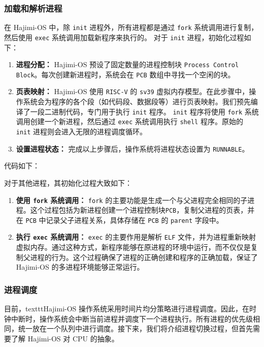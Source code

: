\documentclass[UTF8]{article}
\begin{document}
\subsubsection{加载和解析进程}
在 Hajimi-OS 中，除 \texttt{init} 进程外，所有进程都是通过 \texttt{fork} 系统调用进行复制，然后使用 \texttt{exec} 系统调用加载新程序来执行的。
对于 \texttt{init} 进程，初始化过程如下：
\begin{enumerate}[label=\textbf{\arabic*}., wide, labelwidth=!, labelindent=0pt]
  \item \textbf{进程分配：} Hajimi-OS 预设了固定数量的进程控制块 \texttt{Process Control Block}。每次创建新进程时，系统会在 \texttt{PCB} 数组中寻找一个空闲的块。
  \item \textbf{页表映射：} Hajimi-OS 使用 \texttt{RISC-V} 的 \texttt{sv39} 虚拟内存模型。在此步骤中，操作系统会为程序的各个段（如代码段、数据段等）进行页表映射。我们预先编译了一段二进制代码，专门用于执行 \texttt{init} 程序。 \texttt{init} 程序将使用 \texttt{fork} 系统调用创建一个新进程，然后通过 \texttt{exec} 系统调用执行 \texttt{shell} 程序。原始的 \texttt{init} 进程则会进入无限的进程调度循环。
  \item \textbf{设置进程状态：} 完成以上步骤后，操作系统将进程状态设置为 \texttt{RUNNABLE}。
\end{enumerate}
代码如下：

对于其他进程，其初始化过程大致如下：
\begin{enumerate}[label=\textbf{\arabic*}., wide, labelwidth=!, labelindent=0pt]
  \item \textbf{使用 \texttt{fork} 系统调用：} \texttt{fork} 的主要功能是生成一个与父进程完全相同的子进程。这个过程包括为新进程创建一个进程控制块\texttt{PCB}，复制父进程的页表，并在 \texttt{PCB} 中记录父子进程关系，具体存储在 \texttt{PCB} 的 \texttt{parent} 字段中。
  \item \textbf{执行 \texttt{exec} 系统调用：} \texttt{exec} 的主要作用是解析 \texttt{ELF} 文件，并为进程重新映射虚拟内存。通过这种方式，新程序能够在原进程的环境中运行，而不仅仅是复制父进程的行为。这个过程确保了进程的正确创建和程序的正确加载，保证了 Hajimi-OS 的多进程环境能够正常运行。
\end{enumerate}

\subsubsection{进程调度}
目前，texttt{Hajimi-OS} 操作系统采用时间片均分策略进行进程调度。因此，在时钟中断时，操作系统会中断当前进程并调度下一个进程执行。所有进程的优先级相同，统一放在一个队列中进行调度。接下来，我们将介绍进程切换过程，但首先需要了解 Hajimi-OS 对 CPU 的抽象。
\end{document}
